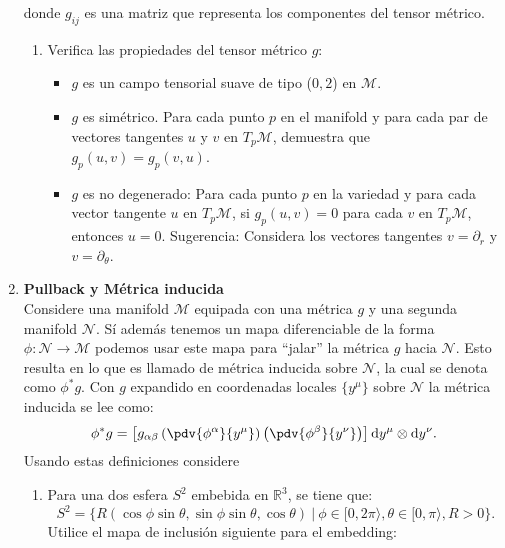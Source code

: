 \documentclass[../main]{subfiles}
\begin{document}
\begin{adjustwidth}{0pt}{-100pt}
\begin{enumerate}
    donde $g_{ij}$ es una matriz que representa los componentes del tensor métrico.
    \begin{enumerate}[label=(\alph*)]
        \item Verifica las propiedades del tensor métrico $g$:
        \begin{itemize}
            \item $g$ es un campo tensorial suave de tipo ($0, 2$) en $\mathcal{M}$.
            \item $g$ es simétrico. Para cada punto $p$ en el manifold y para cada par de vectores tangentes $u$ y $v$ en $T_p \mathcal{M}$, demuestra que $g_p(u,v)=g_p(v, u)$.
            \item $g$ es no degenerado: Para cada punto $p$ en la variedad y para cada vector tangente $u$ en $T_p\mathcal{M}$, si $g_p(u, v)=0$ para cada $v$ en $T_p\mathcal{M}$, entonces $u=0$. Sugerencia: Considera los vectores tangentes $v=\partial_r$ y $v=\partial_{\theta}$.
        \end{itemize}
    \end{enumerate}
    \item \textbf{Pullback y Métrica inducida}\\
    Considere una manifold $\mathcal{M}$ equipada con una métrica $g$ y una segunda manifold $\mathcal{N}$. Sí además tenemos un mapa diferenciable de la forma $\phi: \mathcal{N}\rightarrow \mathcal{M}$ podemos usar este mapa para ``jalar'' la métrica $g$ hacia $\mathcal{N}$. Esto resulta en lo que es llamado de métrica inducida sobre $\mathcal{N}$, la cual se denota como $\phi^* g$. Con $g$ expandido en coordenadas locales $\{ y^{\mu}\}$ sobre $\mathcal{N}$ la métrica inducida se lee como:
    \begin{equation}
        \phi^* g=\left[g_{\alpha\beta}\left(\pdv{\phi^{\alpha}}{y^{\mu}}\right)\left(\pdv{\phi^{\beta}}{y^{\nu}}\right)\right]\mathrm{d}y^{\mu}\otimes \mathrm{d}y^{\nu}.
    \end{equation}
    Usando estas definiciones considere
    \begin{enumerate}[label=(\alph*)]
        \item Para una dos esfera $S^2$ embebida en $\mathbb{R}^3$, se tiene que:
        \begin{equation}
            S^2=\{R(\cos \phi\sin \theta, \sin \phi\sin \theta, \cos \theta) \ | \ \phi \in [0, 2\pi\rangle, \theta \in [0, \pi\rangle, R>0\}.
        \end{equation}
        Utilice el mapa de inclusión siguiente para el embedding:

\end{enumerate}
\end{enumerate}
\end{adjustwidth}
\end{document}
